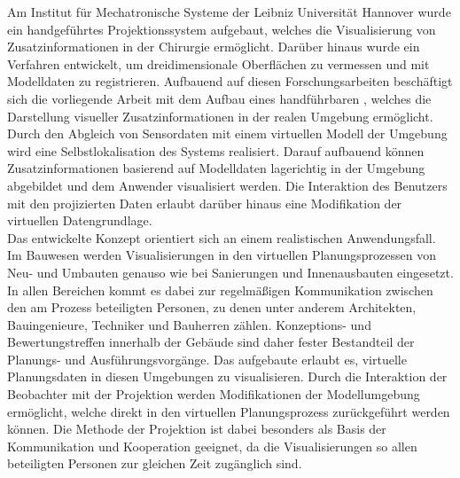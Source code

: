 Am Institut für Mechatronische Systeme der Leibniz Universität Hannover wurde ein handgeführtes Projektionssystem aufgebaut, welches die Visualisierung von Zusatzinformationen in der Chirurgie ermöglicht. Darüber hinaus wurde ein Verfahren entwickelt, um dreidimensionale Oberflächen zu vermessen und mit Modelldaten zu registrieren. Aufbauend auf diesen Forschungsarbeiten beschäftigt sich die vorliegende Arbeit mit dem Aufbau eines handführbaren , welches die Darstellung visueller Zusatzinformationen in der realen Umgebung ermöglicht. Durch den Abgleich von Sensordaten mit einem virtuellen Modell der Umgebung wird eine Selbstlokalisation des Systems realisiert. Darauf aufbauend können Zusatzinformationen basierend auf Modelldaten lagerichtig in der Umgebung abgebildet und dem Anwender visualisiert werden. Die Interaktion des Benutzers mit den projizierten Daten erlaubt darüber hinaus eine Modifikation der virtuellen Datengrundlage.\\

Das entwickelte Konzept orientiert sich an einem realistischen Anwendungsfall. Im Bauwesen werden Visualisierungen in den virtuellen Planungsprozessen von Neu- und Umbauten genauso wie bei Sanierungen und Innenausbauten eingesetzt. In allen Bereichen kommt es dabei zur regelmäßigen Kommunikation zwischen den am Prozess beteiligten Personen, zu denen unter anderem Architekten, Bauingenieure, Techniker und Bauherren zählen. Konzeptions- und Bewertungstreffen innerhalb der Gebäude sind daher fester Bestandteil der Planungs- und Ausführungsvorgänge. Das aufgebaute \kps{} erlaubt es, virtuelle Planungsdaten in diesen Umgebungen zu visualisieren. Durch die Interaktion der Beobachter mit der Projektion werden Modifikationen der Modellumgebung ermöglicht, welche direkt in den virtuellen Planungsprozess zurückgeführt werden können. Die Methode der Projektion ist dabei besonders als Basis der Kommunikation und Kooperation geeignet, da die Visualisierungen so allen beteiligten Personen zur gleichen Zeit zugänglich sind.\\

